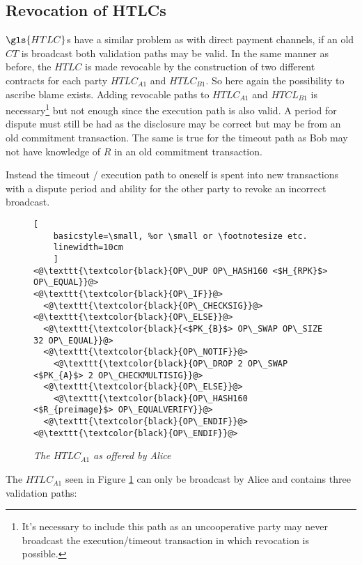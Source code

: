 \subsection{Revocation of HTLCs}

$\gls{HTLC}$s have a similar problem as with direct payment channels, if an old $CT$ is broadcast both validation paths may be valid. In the same manner as before, the $HTLC$ is made revocable by the construction of two different contracts for each party $HTLC_{A1}$ and $HTLC_{B1}$. So here again the possibility to ascribe blame exists. Adding revocable paths to $HTLC_{A1}$ and $HTCL_{B1}$ is necessary\footnote{It's necessary to include this path as an uncooperative party may never broadcast the execution/timeout transaction in which revocation is possible.} but not enough since the execution path is also valid. A period for dispute must still be had as the disclosure may be correct but may be from an old commitment transaction. The same is true for the timeout path as Bob may not have knowledge of $R$ in an old commitment transaction.   

Instead the timeout / execution path to oneself is spent into new transactions with a dispute period and ability for the other party to revoke an incorrect broadcast. 

\begin{figure}[hbt!]

	\centering

	\begin{lstlisting}[
	basicstyle=\small, %or \small or \footnotesize etc.
	linewidth=10cm
	]
<@\texttt{\textcolor{black}{OP\_DUP OP\_HASH160 <$H_{RPK}$> OP\_EQUAL}}@>
<@\texttt{\textcolor{black}{OP\_IF}}@>
  <@\texttt{\textcolor{black}{OP\_CHECKSIG}}@>
<@\texttt{\textcolor{black}{OP\_ELSE}}@>
  <@\texttt{\textcolor{black}{<$PK_{B}$> OP\_SWAP OP\_SIZE 32 OP\_EQUAL}}@>
  <@\texttt{\textcolor{black}{OP\_NOTIF}}@>
    <@\texttt{\textcolor{black}{OP\_DROP 2 OP\_SWAP <$PK_{A}$> 2 OP\_CHECKMULTISIG}}@>  
  <@\texttt{\textcolor{black}{OP\_ELSE}}@> 
    <@\texttt{\textcolor{black}{OP\_HASH160 <$R_{preimage}$> OP\_EQUALVERIFY}}@> 
  <@\texttt{\textcolor{black}{OP\_ENDIF}}@>
<@\texttt{\textcolor{black}{OP\_ENDIF}}@>
	\end{lstlisting}
	
	\caption{\textit{ The $HTLC_{A1}$ as offered by Alice
	}}
	\label{fig:alice:HTLC}
\end{figure}

The $HTLC_{A1}$ seen in Figure \ref{fig:alice:HTLC} can only be broadcast by Alice and contains three validation paths:

